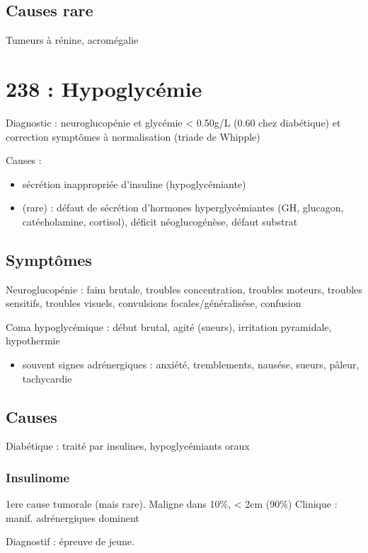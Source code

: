 \documentclass[11pt]{article}
\begin{document}
\subsection{Causes rare}
\label{sec:org7ed725d}
Tumeurs à rénine, acromégalie
\section{238 : Hypoglycémie}
\label{sec:org232b26d}
Diagnostic : neuroglucopénie et glycémie < 0.50g/L (0.60 chez diabétique) et correction symptômes
à normalisation (triade de Whipple)

Causes :
\begin{itemize}
\item sécrétion inappropriée d'insuline (hypoglycémiante)
\item (rare) : défaut de sécrétion d'hormones hyperglycémiantes (GH, glucagon,
catécholamine, cortisol), déficit néoglucogénèse, défaut substrat
\end{itemize}

\subsection{Symptômes}
\label{sec:org04e9d33}
Neuroglucopénie : faim brutale, troubles concentration, troubles moteurs,
troubles sensitifs, troubles visuels, convulsions focales/généralisése,
confusion

Coma hypoglycémique : début brutal, agité (sueurs), irritation pyramidale, hypothermie

\begin{itemize}
\item souvent signes adrénergiques : anxiété, tremblements, nausése, sueurs,
pâleur, tachycardie
\end{itemize}

\subsection{Causes}
\label{sec:org19a343a}
Diabétique : traité par insulines, hypoglycémiants oraux

\subsubsection{Insulinome}
\label{sec:org159ba6f}
1ere cause tumorale (mais rare). Maligne dans 10\%, < 2cm (90\%)
Clinique : manif. adrénergiques dominent

Diagnostif : épreuve de jeune. 
\end{document}

